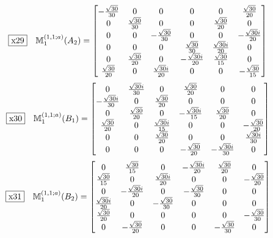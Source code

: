 \documentclass[fleqn,10pt,landscape]{jsarticle}
\begin{document}
\begin{dmath*}
\fbox{x29}\quad \mathbb{M}_{1}^{(1,1;a)}(A_{2})=\begin{bmatrix} - \frac{\sqrt{30}}{30} & 0 & 0 & 0 & 0 & \frac{\sqrt{30}}{20} \\ 0 & \frac{\sqrt{30}}{30} & 0 & 0 & \frac{\sqrt{30}}{20} & 0 \\ 0 & 0 & - \frac{\sqrt{30}}{30} & 0 & 0 & - \frac{\sqrt{30} i}{20} \\ 0 & 0 & 0 & \frac{\sqrt{30}}{30} & \frac{\sqrt{30} i}{20} & 0 \\ 0 & \frac{\sqrt{30}}{20} & 0 & - \frac{\sqrt{30} i}{20} & \frac{\sqrt{30}}{15} & 0 \\ \frac{\sqrt{30}}{20} & 0 & \frac{\sqrt{30} i}{20} & 0 & 0 & - \frac{\sqrt{30}}{15} \end{bmatrix}
\end{dmath*}
\begin{dmath*}
\fbox{x30}\quad \mathbb{M}_{1}^{(1,1;a)}(B_{1})=\begin{bmatrix} 0 & \frac{\sqrt{30} i}{30} & 0 & \frac{\sqrt{30}}{20} & 0 & 0 \\ - \frac{\sqrt{30} i}{30} & 0 & \frac{\sqrt{30}}{20} & 0 & 0 & 0 \\ 0 & \frac{\sqrt{30}}{20} & 0 & - \frac{\sqrt{30} i}{15} & \frac{\sqrt{30}}{20} & 0 \\ \frac{\sqrt{30}}{20} & 0 & \frac{\sqrt{30} i}{15} & 0 & 0 & - \frac{\sqrt{30}}{20} \\ 0 & 0 & \frac{\sqrt{30}}{20} & 0 & 0 & \frac{\sqrt{30} i}{30} \\ 0 & 0 & 0 & - \frac{\sqrt{30}}{20} & - \frac{\sqrt{30} i}{30} & 0 \end{bmatrix}
\end{dmath*}
\begin{dmath*}
\fbox{x31}\quad \mathbb{M}_{1}^{(1,1;a)}(B_{2})=\begin{bmatrix} 0 & \frac{\sqrt{30}}{15} & 0 & - \frac{\sqrt{30} i}{20} & \frac{\sqrt{30}}{20} & 0 \\ \frac{\sqrt{30}}{15} & 0 & \frac{\sqrt{30} i}{20} & 0 & 0 & - \frac{\sqrt{30}}{20} \\ 0 & - \frac{\sqrt{30} i}{20} & 0 & - \frac{\sqrt{30}}{30} & 0 & 0 \\ \frac{\sqrt{30} i}{20} & 0 & - \frac{\sqrt{30}}{30} & 0 & 0 & 0 \\ \frac{\sqrt{30}}{20} & 0 & 0 & 0 & 0 & - \frac{\sqrt{30}}{30} \\ 0 & - \frac{\sqrt{30}}{20} & 0 & 0 & - \frac{\sqrt{30}}{30} & 0 \end{bmatrix}
\end{dmath*}
\end{document}
